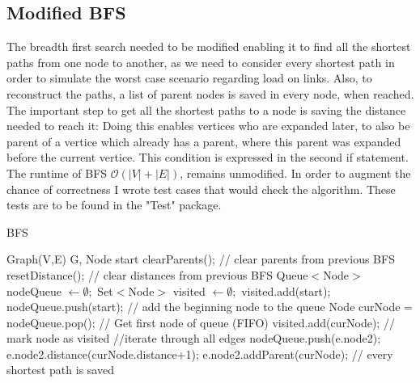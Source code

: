 \documentclass [12pt]{article}
\begin{document}
\subsection{Modified BFS}
The breadth first search needed to be modified enabling it to find all the shortest paths 
from one node to another, as we need to consider every shortest path in order to simulate
the worst case scenario regarding load on links. Also, to reconstruct the paths, a list of parent nodes is saved
in every node, when reached. The important step to get all the shortest paths to a node is saving the distance needed to reach it:
Doing this enables vertices who are expanded later, to also be parent of a vertice which already has a parent, where this parent was
expanded before the current vertice. This condition is expressed in the second if statement.
The runtime of BFS $\mathcal O(|V| + |E|)$, remains unmodified. In order to augment
the chance of correctness I wrote test cases that would check the algorithm.
These tests are to be found in the "Test" package.

\begin{algorithm}[H]
  \caption{BFS}
  \label{BFS}
  \begin{algorithmic}[2]
    \Require Graph(V,E) G, Node start
    \State clearParents();    // clear parents from previous BFS
    \State resetDistance();   // clear distances from previous BFS
    \State Queue$<$Node$>$ nodeQueue $\gets \emptyset;$
    \State Set$<$Node$>$ visited $\gets \emptyset;$
    \State visited.add(start);
    \State nodeQueue.push(start); // add the beginning node to the queue 
    \State Node curNode = nodeQueue.pop(); // Get first node of queue (FIFO)
    \State visited.add(curNode); // mark node as visited
     //iterate through all edges  
    \State nodeQueue.push(e.node2);
    \State e.node2.distance(curNode.distance+1);
    \EndIf
    \State e.node2.addParent(curNode); // every shortest path is saved 
    \EndIf
    \EndFor
    \EndWhile
  \end{algorithmic}
\end{algorithm}
\end{document}
